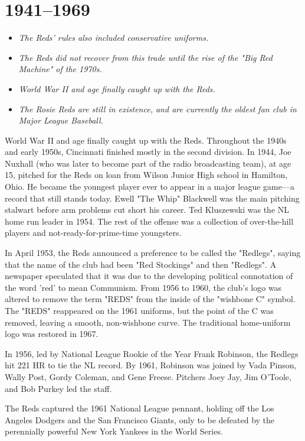 \section{1941--1969}\label{section}

\begin{itemize}
\item
  \emph{The Reds' rules also included conservative uniforms.}
\item
  \emph{The Reds did not recover from this trade until the rise of the
  "Big Red Machine" of the 1970s.}
\item
  \emph{World War II and age finally caught up with the Reds.}
\item
  \emph{The Rosie Reds are still in existence, and are currently the
  oldest fan club in Major League Baseball.}
\end{itemize}

World War II and age finally caught up with the Reds. Throughout the
1940s and early 1950s, Cincinnati finished mostly in the second
division. In 1944, Joe Nuxhall (who was later to become part of the
radio broadcasting team), at age 15, pitched for the Reds on loan from
Wilson Junior High school in Hamilton, Ohio. He became the youngest
player ever to appear in a major league game---a record that still
stands today. Ewell "The Whip" Blackwell was the main pitching stalwart
before arm problems cut short his career. Ted Kluszewski was the NL home
run leader in 1954. The rest of the offense was a collection of
over-the-hill players and not-ready-for-prime-time youngsters.

In April 1953, the Reds announced a preference to be called the
"Redlegs", saying that the name of the club had been "Red Stockings" and
then "Redlegs". A newspaper speculated that it was due to the developing
political connotation of the word 'red' to mean Communism. From 1956 to
1960, the club's logo was altered to remove the term "REDS" from the
inside of the "wishbone C" symbol. The "REDS" reappeared on the 1961
uniforms, but the point of the C was removed, leaving a smooth,
non-wishbone curve. The traditional home-uniform logo was restored in
1967.

In 1956, led by National League Rookie of the Year Frank Robinson, the
Redlegs hit 221 HR to tie the NL record. By 1961, Robinson was joined by
Vada Pinson, Wally Post, Gordy Coleman, and Gene Freese. Pitchers Joey
Jay, Jim O'Toole, and Bob Purkey led the staff.

The Reds captured the 1961 National League pennant, holding off the Los
Angeles Dodgers and the San Francisco Giants, only to be defeated by the
perennially powerful New York Yankees in the World Series.

